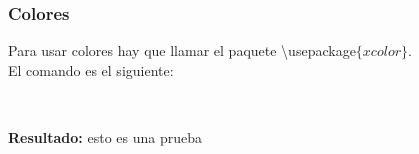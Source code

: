 \begin{frame}
\frametitle{Colores}

\begin{nada}
Para usar colores hay que llamar el paquete 
{\color{blue!40!green} \textbackslash usepackage$\{xcolor\}$}.\\
\vspace{15px}
El comando es el siguiente:

\begin{center}

\\

\textbf{}


\end{center}

\vspace{35px}
\textbf{Resultado: } {\color{magenta} esto es una prueba }
\end{nada}

\end{frame}